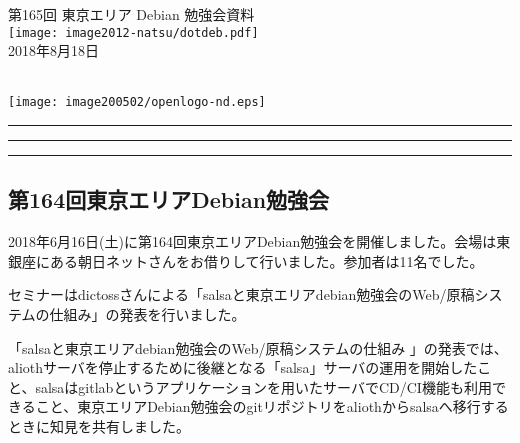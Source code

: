 \documentclass[mingoth,a4paper]{jsarticle}
\newcommand{\debmtgyear}{2018}
\newcommand{\debmtgmonth}{8}
\newcommand{\debmtgdate}{18}
\newcommand{\debmtgnumber}{165}
\begin{document}
\begin{titlepage}
\thispagestyle{empty}

\vspace*{-2cm}
第\debmtgnumber{}回 東京エリア Debian 勉強会資料\\
\hspace*{-2cm}
\texttt{[image: image2012-natsu/dotdeb.pdf]}\\
\hfill{}\debmtgyear{}年\debmtgmonth{}月\debmtgdate{}日

\\

\vspace*{-2cm}
\hfill{}\texttt{[image: image200502/openlogo-nd.eps]}
\end{titlepage}

\newpage

\begin{minipage}[b]{0.2\hsize}
 \colorbox{titleback}{}
\end{minipage}
\begin{minipage}[b]{0.8\hsize}
\hrule
\vspace{2mm}
\hrule
\begin{multicols}{2}
\tableofcontents
\end{multicols}
\vspace{2mm}
\hrule
\end{minipage}


\subsection{第164回東京エリアDebian勉強会}

2018年6月16日(土)に第164回東京エリアDebian勉強会を開催しました。会場は東銀座にある朝日ネットさんをお借りして行いました。参加者は11名でした。

セミナーはdictossさんによる「salsaと東京エリアdebian勉強会のWeb/原稿システムの仕組み」の発表を行いました。

「salsaと東京エリアdebian勉強会のWeb/原稿システムの仕組み 」の発表では、aliothサーバを停止するために後継となる「salsa」サーバの運用を開始したこと、salsaはgitlabというアプリケーションを用いたサーバでCD/CI機能も利用できること、東京エリアDebian勉強会のgitリポジトリをaliothからsalsaへ移行するときに知見を共有しました。
\end{document}
